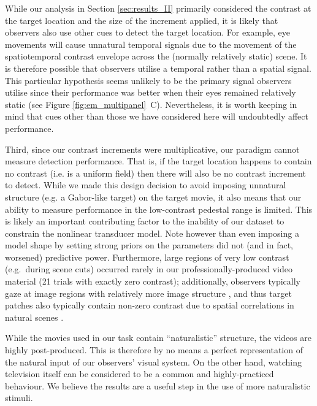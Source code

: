 \documentclass[11pt,a4paper]{article}
\begin{document}
{While our analysis in Section \ref{sec:results_II} primarily considered the contrast at the target location and the size of the increment applied, it is likely that observers also use other cues to detect the target location. 
For example, eye movements will cause unnatural temporal signals due to the movement of the spatiotemporal contrast envelope across the (normally relatively static) scene.
It is therefore possible that observers utilise a temporal rather than a spatial signal. 
This particular hypothesis seems unlikely to be the primary signal observers utilise since their performance was better when their eyes remained relatively static (see Figure \ref{fig:em_multipanel}~C).
Nevertheless, it is worth keeping in mind that cues other than those we have considered here will undoubtedly affect performance.

Third, since our contrast increments were multiplicative, our paradigm cannot measure detection performance.
That is, if the target location happens to contain no contrast (i.e. is a uniform field) then there will also be no contrast increment to detect.
While we made this design decision to avoid imposing unnatural structure (e.g. a Gabor-like target) on the target movie, it also means that our ability to measure performance in the low-contrast pedestal range is limited. 
This is likely an important contributing factor to the inability of our dataset to constrain the nonlinear transducer model. 
Note however than even imposing a model shape by setting strong priors on the parameters did not (and in fact, worsened) predictive power.
Furthermore, large regions of very low contrast (e.g.\ during scene cuts) occurred rarely in our professionally-produced video material (21 trials with exactly zero contrast); additionally, observers typically gaze at image regions with relatively more image structure \citep{ReZa99,ViDoMaBa12}, and thus target patches also typically contain non-zero contrast due to spatial correlations in natural scenes \citep{Simo97,ZeBaWe93a}.

While the movies used in our task contain ``naturalistic'' structure, the videos are highly post-produced.
This is therefore by no means a perfect representation of the natural input of our observers' visual system. 
On the other hand, watching television itself can be considered to be a common and highly-practiced behaviour.
We believe the results are a useful step in the use of more naturalistic stimuli.

}
\end{document}
